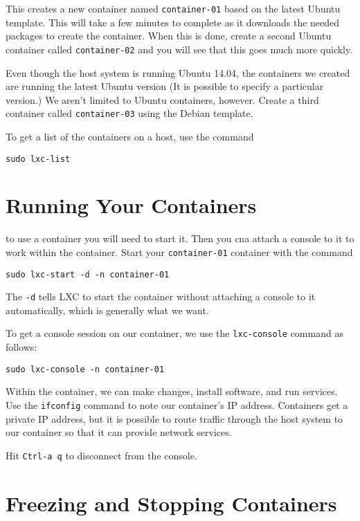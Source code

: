 \documentclass{article}
\begin{document}
This creates a new container named \texttt{container-01} based on the latest Ubuntu template.  This will take a few minutes to complete as it downloads the needed packages to create the container.  When this is done, create a second Ubuntu container called \texttt{container-02} and you will see that this goes much more quickly.

Even though the host system is running Ubuntu 14.04, the containers we created are running the latest Ubuntu version (It is possible to specify a particular version.) We aren't limited to Ubuntu containers, however.  Create a third container called \texttt{container-03} using the Debian template.

To get a list of the containers on a host, use the command

\begin{verbatim}
sudo lxc-list
\end{verbatim}

\section{Running Your Containers}
to use a container you will need to start it.  Then you cna attach a console to it to work within the container.  Start your \texttt{container-01} container with the command

\begin{verbatim}
sudo lxc-start -d -n container-01
\end{verbatim}

The \texttt{-d} tells LXC to start the container without attaching a console to it automatically, which is generally what we want.

To get a console session on our container, we use the \texttt{lxc-console} command as follows:

\begin{verbatim}
sudo lxc-console -n container-01
\end{verbatim}

Within the container, we can make changes, install software, and run services. Use the \texttt{ifconfig} command to note our container's IP address. Containers get a private IP address, but it is possible to route traffic through the host system to our container so that it can provide network services.

Hit \texttt{Ctrl-a q} to disconnect from the console.

\section{Freezing and Stopping Containers}
\end{document}
